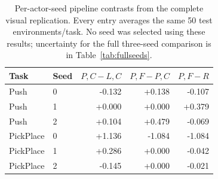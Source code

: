 \begin{table}[H]\centering\small
\caption{Per-actor-seed pipeline contrasts from the complete visual replication. Every entry averages the same 50 test environments/task. No seed was selected using these results; uncertainty for the full three-seed comparison is in Table~\ref{tab:fullseeds}.}\label{tab:seedcontrasts}
\begin{tabular}{llrrr}\toprule Task & Seed & $P,C-L,C$ & $P,F-P,C$ & $P,F-R$\\\midrule
Push & 0 & -0.132 & +0.138 & -0.107\\
Push & 1 & +0.000 & +0.000 & +0.379\\
Push & 2 & +0.104 & +0.479 & -0.069\\
PickPlace & 0 & +1.136 & -1.084 & -1.084\\
PickPlace & 1 & +0.286 & +0.000 & -0.042\\
PickPlace & 2 & -0.145 & +0.000 & -0.021\\
\bottomrule\end{tabular}\end{table}
